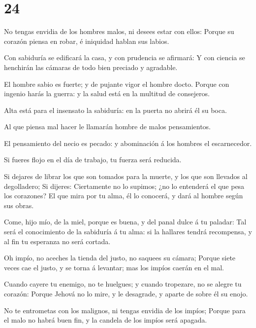 \hypertarget{section-23}{%
\section{24}\label{section-23}}

 No tengas envidia de los hombres malos, ni desees estar
con ellos:  Porque su corazón piensa en robar, é iniquidad
hablan sus labios.

 Con sabiduría se edificará la casa, y con prudencia se
afirmará:  Y con ciencia se henchirán las cámaras de todo
bien preciado y agradable.

 El hombre sabio es fuerte; y de pujante vigor el hombre
docto.  Porque con ingenio harás la guerra: y la salud
está en la multitud de consejeros.

 Alta está para el insensato la sabiduría: en la puerta no
abrirá él su boca.

 Al que piensa mal hacer le llamarán hombre de malos
pensamientos.

 El pensamiento del necio es pecado: y abominación á los
hombres el escarnecedor.

 Si fueres flojo en el día de trabajo, tu fuerza será
reducida.

 Si dejares de librar los que son tomados para la muerte,
y los que son llevados al degolladero;  Si dijeres:
Ciertamente no lo supimos; ¿no lo entenderá el que pesa los corazones?
El que mira por tu alma, él lo conocerá, y dará al hombre según sus
obras.

 Come, hijo mío, de la miel, porque es buena, y del panal
dulce á tu paladar:  Tal será el conocimiento de la
sabiduría á tu alma: si la hallares tendrá recompensa, y al fin tu
esperanza no será cortada.

 Oh impío, no aceches la tienda del justo, no saquees su
cámara;  Porque siete veces cae el justo, y se torna á
levantar; mas los impíos caerán en el mal.

 Cuando cayere tu enemigo, no te huelgues; y cuando
tropezare, no se alegre tu corazón:  Porque Jehová no lo
mire, y le desagrade, y aparte de sobre él su enojo.

 No te entrometas con los malignos, ni tengas envidia de
los impíos;  Porque para el malo no habrá buen fin, y la
candela de los impíos será apagada.

